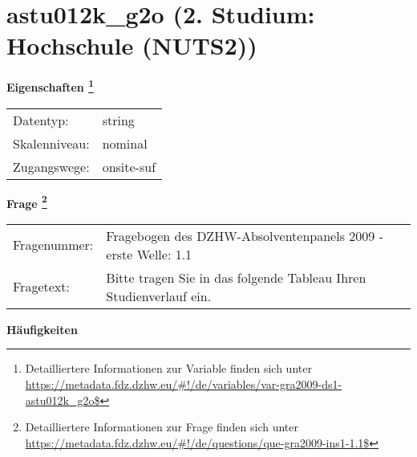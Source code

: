 
    \setcounter{footnote}{0}

    \vspace*{-1.8cm}
	\section{astu012k\_g2o (2. Studium: Hochschule (NUTS2))}
	\label{section:astu012k_g2o}



    \vspace*{0.5cm}
    \noindent\textbf{Eigenschaften
	\footnote{Detailliertere Informationen zur Variable finden sich unter
		\url{https://metadata.fdz.dzhw.eu/\#!/de/variables/var-gra2009-ds1-astu012k_g2o$}}}\\
	\begin{tabularx}{\hsize}{@{}lX}
	Datentyp: & string \\
	Skalenniveau: & nominal \\
	Zugangswege: &
	  onsite-suf
 \\
    \end{tabularx}



				\vspace*{0.5cm}
                \noindent\textbf{Frage
	                \footnote{Detailliertere Informationen zur Frage finden sich unter
		              \url{https://metadata.fdz.dzhw.eu/\#!/de/questions/que-gra2009-ins1-1.1$}}}\\
				\begin{tabularx}{\hsize}{@{}lX}
					Fragenummer: &
					  Fragebogen des DZHW-Absolventenpanels 2009 - erste Welle:
					  1.1
 \\
					Fragetext: & Bitte tragen Sie in das folgende Tableau Ihren Studienverlauf ein. \\
				\end{tabularx}





        		\vspace*{0.5cm}
                \noindent\textbf{Häufigkeiten}

